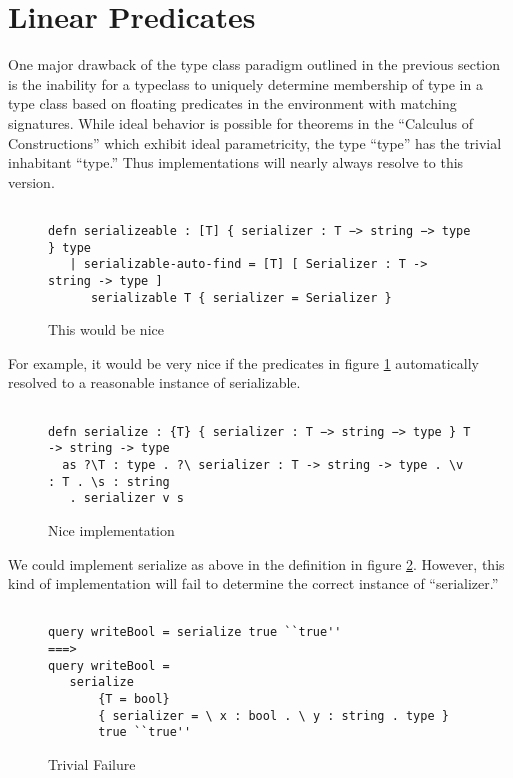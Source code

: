 \section{Linear Predicates}

One major drawback of the type class paradigm outlined in the previous section is the
inability for a typeclass to uniquely determine membership of type in a type class based
on floating predicates in the environment with matching signatures. While ideal behavior
is possible for theorems in the ``Calculus of Constructions'' which exhibit ideal parametricity,
the type “type” has the trivial inhabitant “type.”  Thus implementations
will nearly always resolve to this version.

\begin{figure}[H]
\begin{lstlisting}

defn serializeable : [T] { serializer : T −> string −> type } type
   | serializable-auto-find = [T] [ Serializer : T -> string -> type ]
      serializable T { serializer = Serializer }

\end{lstlisting}
\caption{This would be nice}
\label{lin:nice}
\end{figure}

For example, it would be very nice if the predicates in figure \ref{lin:nice} automatically
resolved to a reasonable instance of serializable.

\begin{figure}[H]
\begin{lstlisting}

defn serialize : {T} { serializer : T −> string −> type } T -> string -> type
  as ?\T : type . ?\ serializer : T -> string -> type . \v : T . \s : string 
   . serializer v s

\end{lstlisting}
\caption{Nice implementation}
\label{lin:imp}
\end{figure}

We could implement serialize as above in the definition in figure \ref{lin:imp}.
However, this kind of implementation will fail to determine the correct instance of ``serializer.''


\begin{figure}[H]
\begin{lstlisting}

query writeBool = serialize true ``true''
===>
query writeBool = 
   serialize 
       {T = bool}
       { serializer = \ x : bool . \ y : string . type } 
       true ``true''

\end{lstlisting}
\caption{Trivial Failure}
\label{lin:fail}
\end{figure}

